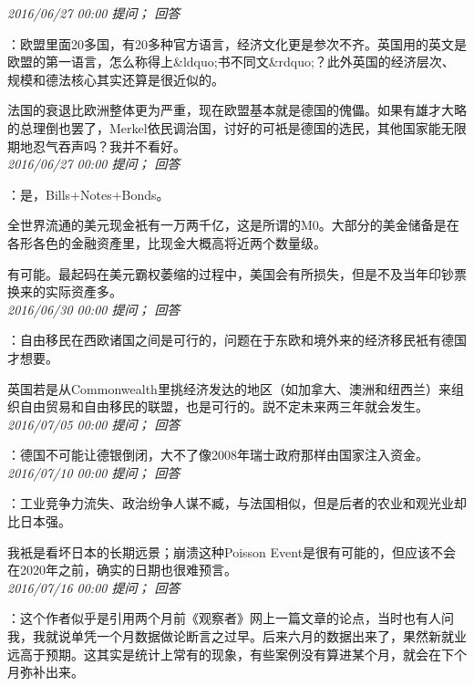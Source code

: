 \documentclass[twocolumn]{ctexart}
\begin{document}
\textit{\hfill\noindent\small 2016/06/27 00:00 提问； 回答}

：欧盟里面20多国，有20多种官方语言，经济文化更是参次不齐。英国用的英文是欧盟的第一语言，怎么称得上\&ldquo;书不同文\&rdquo;？此外英国的经济层次、规模和德法核心其实还算是很近似的。

法国的衰退比欧洲整体更为严重，现在欧盟基本就是德国的傀儡。如果有雄才大略的总理倒也罢了，Merkel依民调治国，讨好的可衹是德国的选民，其他国家能无限期地忍气吞声吗？我并不看好。\\

\textit{\hfill\noindent\small 2016/06/27 00:00 提问； 回答}

：是，Bills+Notes+Bonds。

全世界流通的美元现金衹有一万两千亿，这是所谓的M0。大部分的美金储备是在各形各色的金融资產里，比现金大概高将近两个数量级。

有可能。最起码在美元霸权萎缩的过程中，美国会有所损失，但是不及当年印钞票换来的实际资產多。\\

\textit{\hfill\noindent\small 2016/06/30 00:00 提问； 回答}

：自由移民在西欧诸国之间是可行的，问题在于东欧和境外来的经济移民衹有德国才想要。

英国若是从Commonwealth里挑经济发达的地区（如加拿大、澳洲和纽西兰）来组织自由贸易和自由移民的联盟，也是可行的。説不定未来两三年就会发生。\\

\textit{\hfill\noindent\small 2016/07/05 00:00 提问； 回答}

：德国不可能让德银倒闭，大不了像2008年瑞士政府那样由国家注入资金。\\

\textit{\hfill\noindent\small 2016/07/10 00:00 提问； 回答}

：工业竞争力流失、政治纷争人谋不臧，与法国相似，但是后者的农业和观光业却比日本强。

我衹是看坏日本的长期远景；崩溃这种Poisson Event是很有可能的，但应该不会在2020年之前，确实的日期也很难预言。\\

\textit{\hfill\noindent\small 2016/07/16 00:00 提问； 回答}

：这个作者似乎是引用两个月前《观察者》网上一篇文章的论点，当时也有人问我，我就说单凭一个月数据做论断言之过早。后来六月的数据出来了，果然新就业远高于预期。这其实是统计上常有的现象，有些案例没有算进某个月，就会在下个月弥补出来。
\end{document}
